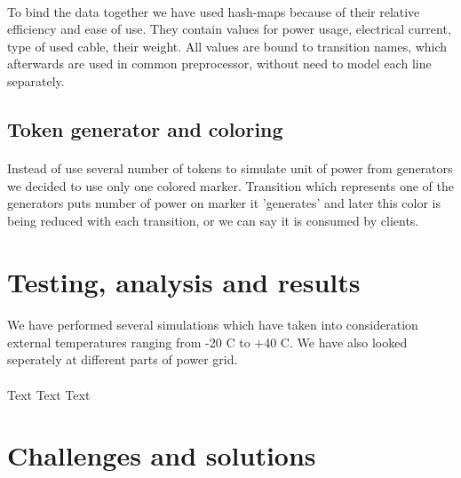 \documentclass[a4paper]{article}
\begin{document}
\paragraph{}

To bind the data together we have used hash-maps because of their relative efficiency and ease of use. They contain values for power usage, electrical current, type of used cable, their weight. All values are bound to transition names, which afterwards are used in common preprocessor, without need to model each line separately.

\subsection{Token generator and coloring}
\label{sec:tokenGeneratorAndColoring}
\paragraph{}

Instead of use several number of tokens to simulate unit of power from generators we decided to use only one colored marker. Transition which represents one of the generators puts number of power on marker it 'generates' and later this color is being reduced with each transition, or we can say it is consumed by clients.

%                                      
\section{Testing, analysis and results}   
\label{cha:testingAnalysisAndResults}
\paragraph{}

We have performed several simulations which have taken into consideration external temperatures ranging from -20 C to +40 C. We have also looked seperately at different parts of power grid. 


\paragraph{}
Text Text Text

%
\section{Challenges and solutions}    
\label{cha:ChallengesAndSolutions}
\end{document}
